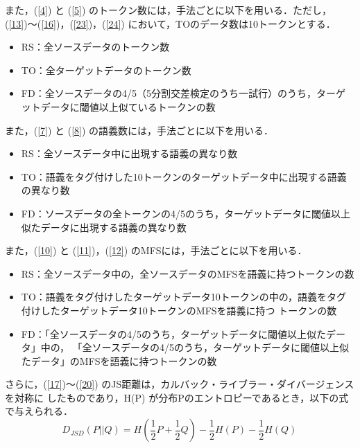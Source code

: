 \documentclass[japanese]{jnlp_1.4}
\begin{document}
また，(\ref{4}) と (\ref{5}) のトークン数には，手法ごとに以下を用いる．ただし，(\ref{13})〜(\ref{16})，(\ref{23})，(\ref{24}) 
において，TOのデータ数は10トークンとする．
\begin{itemize}
\item RS：全ソースデータのトークン数
\item TO：全ターゲットデータのトークン数
\item FD：全ソースデータの4/5（5分割交差検定のうち一試行）のうち，ターゲットデータに閾値以上似ているトークンの数
\end{itemize}

また，(\ref{7}) と (\ref{8}) の語義数には，手法ごとに以下を用いる．
\begin{itemize}
\item RS：全ソースデータ中に出現する語義の異なり数
\item TO：語義をタグ付けした10トークンのターゲットデータ中に出現する語義の異なり数
\item FD：ソースデータの全トークンの4/5のうち，ターゲットデータに閾値以上似たデータに出現する語義の異なり数
\end{itemize}

また，(\ref{10}) と (\ref{11})，(\ref{12}) のMFSには，手法ごとに以下を用いる．
\begin{itemize}
\item RS：全ソースデータ中の，全ソースデータのMFSを語義に持つトークンの数
\item TO：語義をタグ付けしたターゲットデータ10トークンの中の，語義をタグ付けしたターゲットデータ10トークンのMFSを語義に持つ
トークンの数
\item FD：「全ソースデータの4/5のうち，ターゲットデータに閾値以上似たデータ」中の，
「全ソースデータの4/5のうち，ターゲットデータに閾値以上似たデータ」のMFSを語義に持つトークンの数
\end{itemize}

さらに，(\ref{17})〜(\ref{20}) のJS距離は，カルバック・ライブラー・ダイバージェンスを対称に
したものであり，H(P) が分布Pのエントロピーであるとき，以下の式で与えられる．
\begin{equation}
D_{JSD}(P||Q)=H(\frac{1}{2}P+\frac{1}{2}Q)-\frac{1}{2}H(P)-\frac{1}{2}H(Q)\label{eq1}
\end{equation}
\end{document}
